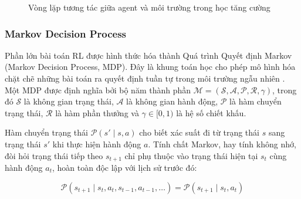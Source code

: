 \begin{figure}[H]
    \centering
    \caption{Vòng lặp tương tác giữa agent và môi trường trong học tăng cường}
    \label{fig:rl_loop}
\end{figure}

\subsubsection{Markov Decision Process}
\label{sub:mdp}

\indent Phần lớn bài toán RL được hình thức hóa thành Quá trình Quyết định Markov (Markov
Decision Process, MDP). Đây là khung toán học cho phép mô hình hóa chặt chẽ những bài
toán ra quyết định tuần tự trong môi trường ngẫu nhiên \cite{puterman1994markov}. Một MDP
được định nghĩa bởi bộ năm thành phần
$\mathcal{M} = (\mathcal{S}, \mathcal{A}, \mathcal{P}, \mathcal{R}, \gamma)$, trong
đó $\mathcal{S}$ là không gian trạng thái, $\mathcal{A}$ là không gian hành động,
$\mathcal{P}$ là hàm chuyển trạng thái, $\mathcal{R}$ là hàm phần thưởng và $\gamma
\in [0, 1)$ là hệ số chiết khấu.

\indent Hàm chuyển trạng thái $\mathcal{P}(s' \mid s, a)$ cho biết xác suất đi từ trạng
thái $s$ sang trạng thái $s'$ khi thực hiện hành động $a$. Tính chất Markov, hay tính
không nhớ, đòi hỏi trạng thái tiếp theo $s_{t+1}$ chỉ phụ thuộc vào trạng thái hiện tại
$s_t$ cùng hành động $a_t$, hoàn toàn độc lập với lịch sử trước đó:

\begin{equation}
    \mathcal{P}(s_{t+1} \mid s_t, a_t, s_{t-1}, a_{t-1}, \ldots) =
    \mathcal{P}(s_{t+1} \mid s_t, a_t)
\end{equation}

